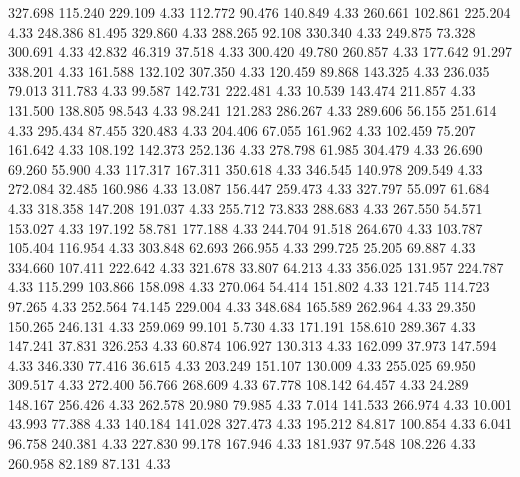  327.698  115.240  229.109         4.33
 112.772   90.476  140.849         4.33
 260.661  102.861  225.204         4.33
 248.386   81.495  329.860         4.33
 288.265   92.108  330.340         4.33
 249.875   73.328  300.691         4.33
  42.832   46.319   37.518         4.33
 300.420   49.780  260.857         4.33
 177.642   91.297  338.201         4.33
 161.588  132.102  307.350         4.33
 120.459   89.868  143.325         4.33
 236.035   79.013  311.783         4.33
  99.587  142.731  222.481         4.33
  10.539  143.474  211.857         4.33
 131.500  138.805   98.543         4.33
  98.241  121.283  286.267         4.33
 289.606   56.155  251.614         4.33
 295.434   87.455  320.483         4.33
 204.406   67.055  161.962         4.33
 102.459   75.207  161.642         4.33
 108.192  142.373  252.136         4.33
 278.798   61.985  304.479         4.33
  26.690   69.260   55.900         4.33
 117.317  167.311  350.618         4.33
 346.545  140.978  209.549         4.33
 272.084   32.485  160.986         4.33
  13.087  156.447  259.473         4.33
 327.797   55.097   61.684         4.33
 318.358  147.208  191.037         4.33
 255.712   73.833  288.683         4.33
 267.550   54.571  153.027         4.33
 197.192   58.781  177.188         4.33
 244.704   91.518  264.670         4.33
 103.787  105.404  116.954         4.33
 303.848   62.693  266.955         4.33
 299.725   25.205   69.887         4.33
 334.660  107.411  222.642         4.33
 321.678   33.807   64.213         4.33
 356.025  131.957  224.787         4.33
 115.299  103.866  158.098         4.33
 270.064   54.414  151.802         4.33
 121.745  114.723   97.265         4.33
 252.564   74.145  229.004         4.33
 348.684  165.589  262.964         4.33
  29.350  150.265  246.131         4.33
 259.069   99.101    5.730         4.33
 171.191  158.610  289.367         4.33
 147.241   37.831  326.253         4.33
  60.874  106.927  130.313         4.33
 162.099   37.973  147.594         4.33
 346.330   77.416   36.615         4.33
 203.249  151.107  130.009         4.33
 255.025   69.950  309.517         4.33
 272.400   56.766  268.609         4.33
  67.778  108.142   64.457         4.33
  24.289  148.167  256.426         4.33
 262.578   20.980   79.985         4.33
   7.014  141.533  266.974         4.33
  10.001   43.993   77.388         4.33
 140.184  141.028  327.473         4.33
 195.212   84.817  100.854         4.33
   6.041   96.758  240.381         4.33
 227.830   99.178  167.946         4.33
 181.937   97.548  108.226         4.33
 260.958   82.189   87.131         4.33
